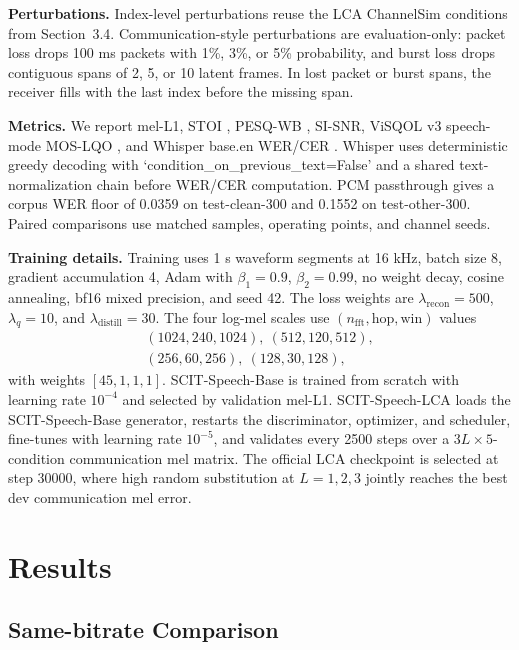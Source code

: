﻿\documentclass[conference]{IEEEtran}
\newcommand{\base}{SCIT-Speech-Base}
\newcommand{\lca}{SCIT-Speech-LCA}
\begin{document}
\textbf{Perturbations.}
Index-level perturbations reuse the LCA ChannelSim conditions from Section~3.4. Communication-style perturbations are evaluation-only: packet loss drops 100 ms packets with 1\%, 3\%, or 5\% probability, and burst loss drops contiguous spans of 2, 5, or 10 latent frames. In lost packet or burst spans, the receiver fills with the last index before the missing span.

\textbf{Metrics.}
We report mel-L1, STOI \cite{taal2011stoi}, PESQ-WB \cite{itu2001pesq}, SI-SNR, ViSQOL v3 speech-mode MOS-LQO \cite{chinen2020visqol}, and Whisper base.en WER/CER \cite{radford2022whisper}. Whisper uses deterministic greedy decoding with `condition\_on\_previous\_text=False' and a shared text-normalization chain before WER/CER computation. PCM passthrough gives a corpus WER floor of 0.0359 on test-clean-300 and 0.1552 on test-other-300. Paired comparisons use matched samples, operating points, and channel seeds.

\textbf{Training details.}
Training uses 1 s waveform segments at 16 kHz, batch size 8, gradient accumulation 4, Adam with \(\beta_1=0.9\), \(\beta_2=0.99\), no weight decay, cosine annealing, bf16 mixed precision, and seed 42. The loss weights are \(\lambda_{\mathrm{recon}}=500\), \(\lambda_q=10\), and \(\lambda_{\mathrm{distill}}=30\). The four log-mel scales use \((n_{\mathrm{fft}},\mathrm{hop},\mathrm{win})\) values
\[
\begin{gathered}
(1024,240,1024),\ (512,120,512),\\
(256,60,256),\ (128,30,128),
\end{gathered}
\]
with weights \([45,1,1,1]\). \base{} is trained from scratch with learning rate \(10^{-4}\) and selected by validation mel-L1. \lca{} loads the \base{} generator, restarts the discriminator, optimizer, and scheduler, fine-tunes with learning rate \(10^{-5}\), and validates every 2500 steps over a \(3L\times5\)-condition communication mel matrix. The official LCA checkpoint is selected at step 30000, where high random substitution at \(L=1,2,3\) jointly reaches the best dev communication mel error.

\section{Results}

\subsection{Same-bitrate Comparison}
\end{document}
